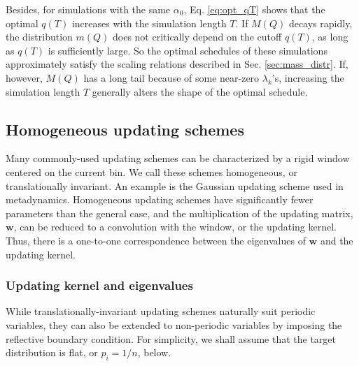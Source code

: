 \documentclass[reprint, floatfix]{revtex4-1}
\begin{document}
Besides,
for simulations with the same $\alpha_0$,
Eq. \eqref{eq:opt_qT} shows that
the optimal $q(T)$ increases with
the simulation length $T$.
%
If $M(Q)$ decays rapidly,
the distribution $m(Q)$ does not critically
depend on the cutoff $q(T)$,
as long as $q(T)$ is sufficiently large.
%
So the optimal schedules of these simulations
approximately satisfy the scaling relations
described in Sec. \ref{sec:mass_distr}.
%
If, however, $M(Q)$ has a long tail
because of some near-zero $\lambda_k$'s,
increasing the simulation length $T$
generally alters the shape of the optimal schedule.




\subsection{\label{sec:band-matrix}
Homogeneous updating schemes}



Many commonly-used updating schemes
can be characterized by a rigid window
centered on the current bin.
%
We call these schemes homogeneous,
or translationally invariant.
%
An example is the Gaussian updating scheme
used in metadynamics.
%
Homogeneous updating schemes have significantly fewer
parameters than the general case,
and the multiplication of the updating matrix,
$\mathbf w$,
can be reduced to a convolution with the window,
or the updating kernel.
%
Thus,
there is a one-to-one correspondence between
the eigenvalues of $\mathbf w$
and the updating kernel.



\subsubsection{\label{sec:bandkernel}
Updating kernel and eigenvalues}



While translationally-invariant
updating schemes
naturally suit periodic variables\cite{
dama2014},
they can also be extended to non-periodic variables
by imposing the reflective boundary condition\cite{
bussi2006}.
%
For simplicity, we shall assume that the target
distribution is flat, or $p_i = 1/n$, below.
\end{document}
